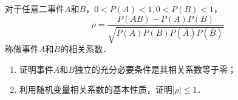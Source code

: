 \documentclass[plain,noanswer,medmath]{../../template/jnuexam}
\begin{document}




\begin{problem}
对于任意二事件$A$和$B$，$0 < P(A) < 1,0 < P(B) < 1$，
$$\rho = \frac{P(AB) - P(A)P(B)}{\sqrt{P(A)P(B)P(\bar A)P(\bar B)}}$$
称做事件$A$和$B$的相关系数．
\begin{enumerate}
\item 证明事件$A$和$B$独立的充分必要条件是其相关系数等于零；
\item 利用随机变量相关系数的基本性质，证明$\left| \rho \right| \le 1$．
\end{enumerate}
\end{problem}
\end{document}
